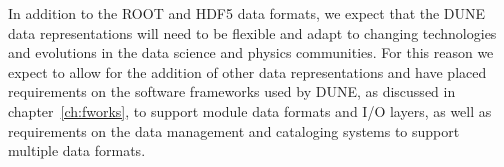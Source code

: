 \documentclass[../main-v1.tex]{subfiles}
\begin{document}
In addition to the ROOT and HDF5 data formats, we expect that the DUNE data representations will need to be flexible and adapt to changing technologies and evolutions in the data science and physics communities.  For this reason we expect to allow for the addition of other data representations and have placed requirements on the software frameworks used by DUNE, as discussed in chapter~\ref{ch:fworks}, to support module data formats and I/O layers, as well as requirements on the data management and cataloging systems to support multiple data formats.



\end{document}
